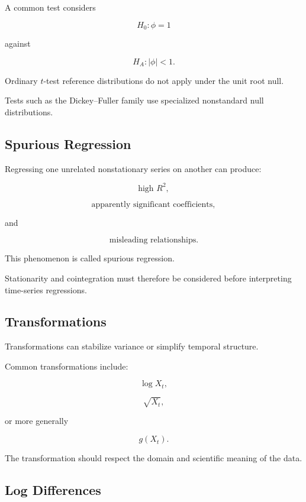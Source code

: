 A common test considers

\[
H_0:
\phi=1
\]

against

\[
H_A:
|\phi|<1.
\]

Ordinary \(t\)-test reference distributions do not apply under the unit
root null.

Tests such as the Dickey--Fuller family use specialized nonstandard null
distributions.

\subsection{Spurious Regression}
\label{subsec:spurious-regression}

Regressing one unrelated nonstationary series on another can produce:

\[
\boxed{
\text{high }R^2,
}
\]

\[
\boxed{
\text{apparently significant coefficients},
}
\]

and

\[
\boxed{
\text{misleading relationships}.
}
\]

This phenomenon is called spurious regression.

Stationarity and cointegration must therefore be considered before
interpreting time-series regressions.

\subsection{Transformations}
\label{subsec:time-series-transformations}

Transformations can stabilize variance or simplify temporal structure.

Common transformations include:

\[
\boxed{
\log X_t,
}
\]

\[
\boxed{
\sqrt{X_t},
}
\]

or more generally

\[
\boxed{
g(X_t).
}
\]

The transformation should respect the domain and scientific meaning of
the data.

\subsection{Log Differences}
\label{subsec:log-differences}

